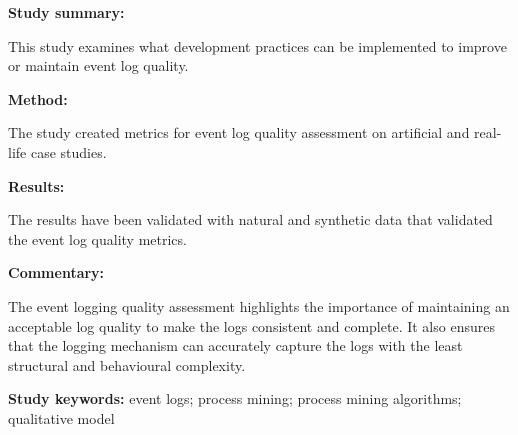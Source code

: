 \begin{tcolorbox}[colback=gray!5!white, colframe=pastelgreen!40!black, title=Towards a better assessment of event logs quality\cite{Kherbouche2017}]
	\begin{minipage}[t]{0.25\textwidth}
		\textbf{Study summary:}
	\end{minipage}
	\hfill
	\begin{minipage}[t]{0.65\textwidth}
		This study examines what development practices can be implemented to improve or maintain
		event log quality.
	\end{minipage}

	\vspace{0.75em} 

	\begin{minipage}[t]{0.25\textwidth}
		\textbf{Method:}
	\end{minipage}
	\hfill
	\begin{minipage}[t]{0.65\textwidth}
		The study created metrics for event log quality assessment on artificial and real-life case studies.
	\end{minipage}

	\vspace{0.75em} 

	\begin{minipage}[t]{0.25\textwidth}
		\textbf{Results:}
	\end{minipage}
	\hfill
	\begin{minipage}[t]{0.65\textwidth}
		The results have been validated with natural and synthetic data that validated the event log quality metrics.	
	\end{minipage}

	\vspace{0.75em} 

	\begin{minipage}[t]{0.25\textwidth}
		\textbf{Commentary:}
	\end{minipage}
	\hfill
	\begin{minipage}[t]{0.65\textwidth}
		The event logging quality assessment highlights the importance of maintaining an acceptable
		log quality to make the logs consistent and complete. It also ensures that the logging mechanism can accurately capture the logs with the least structural and behavioural
		complexity. 
	\end{minipage}
	\tcblower
	\textbf{Study keywords:} event logs; process mining; process mining algorithms; qualitative
	model
\end{tcolorbox}

